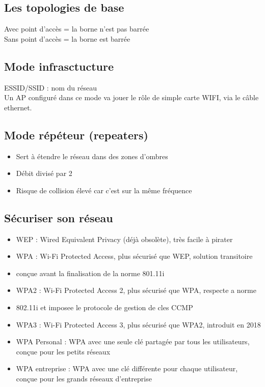 \documentclass[12pt, a4paper]{article}
\begin{document}
\subsection{Les topologies de base}
Avec point d'accès = la borne n'est pas barrée\\
Sans point d'accès = la borne est barrée

\subsection{Mode infrasctucture}
ESSID/SSID : nom du réseau\\
Un AP configuré dans ce mode va jouer le rôle de simple carte WIFI, via le câble 
ethernet. 
\subsection{Mode répéteur (repeaters)}
\begin{itemize}
    \item Sert à étendre le réseau dans des zones d'ombres
    \item Débit divisé par 2
    \item Risque de collision élevé car c'est sur la même fréquence
\end{itemize}

\subsection{Sécuriser son réseau}
\begin{itemize}
    \item WEP : Wired Equivalent Privacy (déjà obsolète), très facile à pirater
    \item WPA : Wi-Fi Protected Access, plus sécurisé que WEP, solution transitoire 
    \item conçue avant la finalisation de la norme 801.11i
    \item WPA2 : Wi-Fi Protected Access 2, plus sécurisé que WPA, respecte a norme 
    \item 802.11i et imposee le protocole de gestion de cles CCMP
    \item WPA3 : Wi-Fi Protected Access 3, plus sécurisé que WPA2, introduit en 2018
    \item WPA Personal : WPA avec une seule clé partagée par tous les utilisateurs, conçue pour les petits réseaux 
    \item WPA entreprise : WPA avec une clé différente pour chaque utilisateur, conçue pour les grands réseaux d'entreprise\\
\end{itemize}
\end{document}
